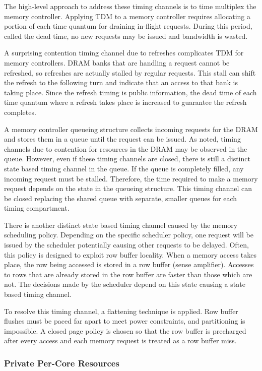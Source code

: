 The high-level approach to address these timing channels is to time multiplex 
the memory controller. Applying TDM to a memory controller requires allocating 
a portion of each time quantum for draining in-flight requests. During this 
period, called the dead time, no new requests may be issued and bandwidth is 
wasted. 

A surprising contention timing channel due to refreshes complicates TDM for 
memory controllers. DRAM banks that are handling a request cannot be refreshed, 
so refreshes are actually stalled by regular requests. This stall can shift the 
refresh to the following turn and indicate that an access to that bank is 
taking place. Since the refresh timing is public information, the dead time of 
each time quantum where a refresh takes place is increased to guarantee the 
refresh completes.

A memory controller queueing structure collects incoming requests for the DRAM 
and stores them in a queue until the request can be issued.  As noted, timing 
channels due to contention for resources in the
DRAM may be observed in the queue. However, even if these timing channels are 
closed, there is still a distinct state based timing channel in the queue.  If 
the queue is completely filled, any incoming request must be stalled.  
Therefore, the time required to make a memory request depends on the state in 
the queueing structure. This timing channel can be closed replacing the shared 
queue with separate, smaller queues for each timing compartment.

There is another distinct state based timing channel caused by the memory 
scheduling policy. Depending on the specific scheduler policy, one request will 
be issued by the scheduler potentially causing other requests to be delayed.  
Often, this policy is designed to exploit row buffer locality. When a memory 
access takes place, the row being accessed is stored in a row buffer (sense 
amplifier). Accesses to rows that are already stored in the row buffer are 
faster than those which are not. The decisions made by the scheduler depend on 
this state causing a state based timing channel.

To resolve this timing channel, a flattening technique is applied. Row buffer 
flushes must be paced far apart to meet power constraints, and partitioning is 
impossible. A closed page policy is chosen so that the row buffer is precharged 
after every access and each memory request is treated as a row buffer miss.


\subsubsection{Private Per-Core Resources}

